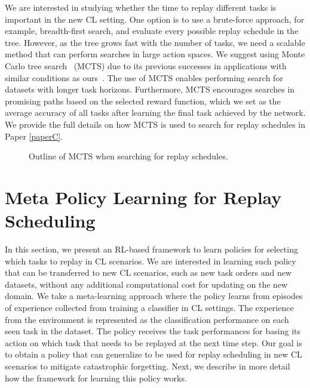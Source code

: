 We are interested in studying whether the time to replay different tasks is important in the new CL setting. One option is to use a brute-force approach, for example, breadth-first search, and evaluate every possible replay schedule in the tree. However, as the tree grows fast with the number of tasks, we need a scalable method that can perform searches in large action spaces. We suggest using Monte Carlo tree search~\cite{coulom2006efficient} (MCTS) due to its previous successes in applications with similar conditions as ours~\cite{browne2012survey, silver2016mastering, chaudhry2018feature}. The use of MCTS enables performing search for datasets with longer task horizons. Furthermore, MCTS encourages searches in promising paths based on the selected reward function, which we set as the average accuracy of all tasks after learning the final task achieved by the network. We provide the full details on how MCTS is used to search for replay schedules in Paper \ref{paperC}. 

\begin{figure}[t]
	\centering
	
	\caption{Outline of MCTS when searching for replay schedules. }
	\label{fig:mcts_outline}
\end{figure}



\section{Meta Policy Learning for Replay Scheduling}
\label{sec:meta_policy_learning_for_replay_scheduling}

In this section, we present an RL-based framework to learn policies for selecting which tasks to replay in CL scenarios. We are interested in learning such policy that can be transferred to new CL scenarios, such as new task orders and new datasets, without any additional computational cost for updating on the new domain. We take a meta-learning approach where the policy learns from episodes of experience collected from training a classifier in CL settings. The experience from the environment is represented as the classification performance on each seen task in the dataset. The policy receives the task performances for basing its action on which task that needs to be replayed at the next time step. Our goal is to obtain a policy that can generalize to be used for replay scheduling in new CL scenarios to mitigate catastrophic forgetting. Next, we describe in more detail how the framework for learning this policy works.

